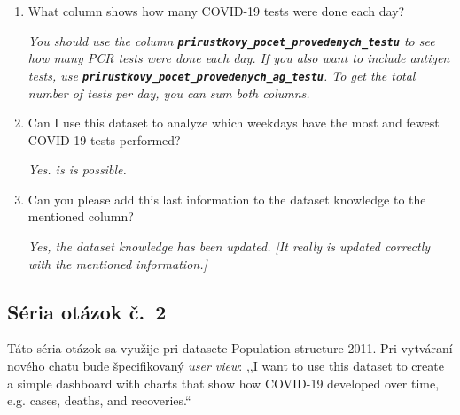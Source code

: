 \begin{enumerate}
\item What column shows how many COVID-19 tests were done each day?

\textit{You should use the column \textbf{\texttt{prirustkovy\_pocet\_provedenych\_testu}} to see how many PCR tests were done each day. If you also want to include antigen tests, use \textbf{\texttt{prirustkovy\_pocet\_provedenych\_ag\_testu}}. To get the total number of tests per day, you can sum both columns.}

\item Can I use this dataset to analyze which weekdays have the most and fewest COVID-19 tests performed?

\textit{Yes. is is possible.}

\item Can you please add this last information to the dataset knowledge to the mentioned column?

\textit{Yes, the dataset knowledge has been updated. [It really is updated correctly with the mentioned information.]}
\end{enumerate}

\subsection{Séria otázok č.~2}

Táto séria otázok sa využije pri datasete Population structure 2011. Pri vytváraní nového chatu bude špecifikovaný \textit{user view}: ,,I want to use this dataset to create a simple dashboard with charts that show how COVID-19 developed over time, e.g. cases, deaths, and recoveries.``

